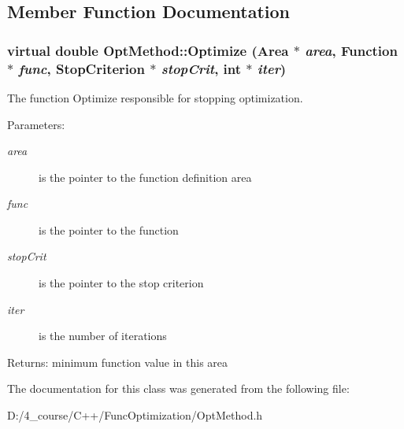 \subsection{Member Function Documentation}
\hypertarget{class_opt_method_870f036f617f136871f438570f67140b}{
\subsubsection[{Optimize}]{\setlength{\rightskip}{0pt plus 5cm}virtual double OptMethod::Optimize ({\bf Area} $\ast$ {\em area}, \/  {\bf Function} $\ast$ {\em func}, \/  {\bf StopCriterion} $\ast$ {\em stopCrit}, \/  int $\ast$ {\em iter})}}
\label{class_opt_method_870f036f617f136871f438570f67140b}


The function Optimize responsible for stopping optimization.

\begin{Desc}
\item[Parameters:]
\begin{description}
\item[{\em area}]is the pointer to the function definition area \item[{\em func}]is the pointer to the function \item[{\em stopCrit}]is the pointer to the stop criterion \item[{\em iter}]is the number of iterations \end{description}
\end{Desc}
\begin{Desc}
\item[Returns:]minimum function value in this area \end{Desc}


The documentation for this class was generated from the following file:\begin{CompactItemize}
\item 
D:/4\_\-course/C++/FuncOptimization/OptMethod.h\end{CompactItemize}
